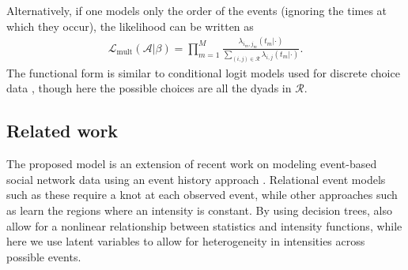 Alternatively, if one models only the order of the events (ignoring the times at which they occur), the likelihood can be written as
\begin{align}
\mathcal{L}_{\mbox{mult}}(\mathcal{A}|\beta) = \prod_{m=1}^M \frac{\lambda_{i_m,j_m}(t_m | \cdot)}{\sum_{(i,j) \in \mathcal{R}} \lambda_{i,j}(t_m | \cdot)}.
\label{eqn:multllk}
\end{align}
The functional form is similar to conditional logit models used for discrete choice data \cite{McFadden1984}, though here the possible choices are all the dyads in $\mathcal{R}$.

\subsection{Related work}
The proposed model is an extension of recent work on modeling event-based social network data using an event history approach \cite{Butts2008,Brandes2009,Perry2011,Stadtfeld2010,Stadtfeld2011,Opsahl2011,Vu2011,Vu2011a}. %
Relational event models such as these require a knot at each observed event, while other approaches such as \cite{Gunawardana2011} learn the regions where an intensity is constant.
By using decision trees,  \cite{Gunawardana2011} also allow for a nonlinear relationship between statistics and intensity functions, while here we use latent variables to allow for heterogeneity in intensities across possible events.
